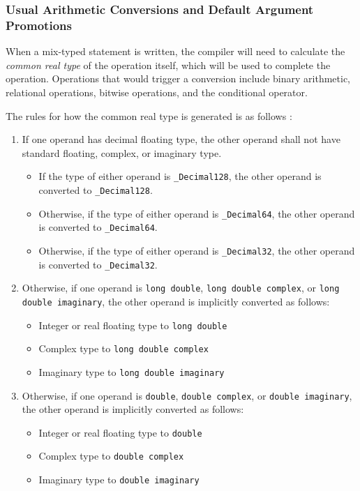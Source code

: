 \subsubsection{Usual Arithmetic Conversions and Default Argument Promotions}

When a mix-typed statement is written, the compiler will need to calculate the \textit{common real type} of the operation itself, which will be used to complete the operation. Operations that would trigger a conversion include binary arithmetic, relational operations, bitwise operations, and the conditional operator.

The rules for how the common real type is generated is as follows \cite{c_standard}:
\begin{enumerate}
    \item If one operand has decimal floating type, the other operand shall not have standard floating, complex, or imaginary type.
    \begin{itemize}
        \item If the type of either operand is \texttt{\_Decimal128}, the other operand is converted to \texttt{\_Decimal128}.
        \item Otherwise, if the type of either operand is \texttt{\_Decimal64}, the other operand is converted to \texttt{\_Decimal64}.
        \item Otherwise, if the type of either operand is \texttt{\_Decimal32}, the other operand is converted to \texttt{\_Decimal32}.
    \end{itemize}

    \item Otherwise, if one operand is \texttt{long double}, \texttt{long double complex}, or \texttt{long double imaginary}, the other operand is implicitly converted as follows:
    \begin{itemize}
        \item Integer or real floating type to \texttt{long double}
        \item Complex type to \texttt{long double complex}
        \item Imaginary type to \texttt{long double imaginary}
    \end{itemize}

    \item Otherwise, if one operand is \texttt{double}, \texttt{double complex}, or \texttt{double imaginary}, the other operand is implicitly converted as follows:
    \begin{itemize}
        \item Integer or real floating type to \texttt{double}
        \item Complex type to \texttt{double complex}
        \item Imaginary type to \texttt{double imaginary}
    \end{itemize}


\end{enumerate}
